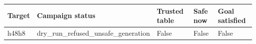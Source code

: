 {\small
\begin{tabular}{lllll}
\hline
Target & Campaign status & Trusted table & Safe now & Goal satisfied \\
\hline
h48h8 & dry\_run\_refused\_unsafe\_generation & False & False & False \\
\hline
\end{tabular}
}
